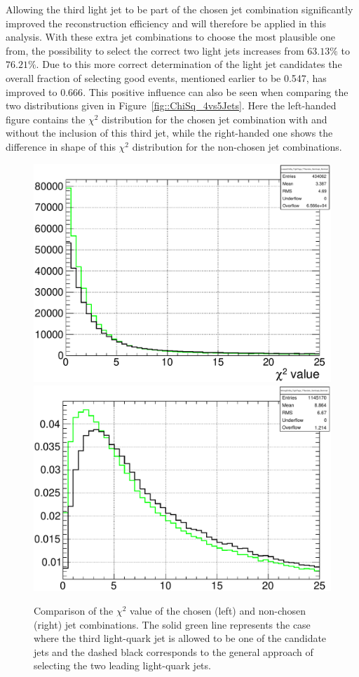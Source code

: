 Allowing the third light jet to be part of the chosen jet combination significantly improved the reconstruction efficiency and will therefore be applied in this analysis.
With these extra jet combinations to choose the most plausible one from, the possibility to select the correct two light jets increases from $63.13 \%$ to $76.21 \%$.
Due to this more correct determination of the light jet candidates the overall fraction of selecting good events, mentioned earlier to be 0.547, has improved to $0.666$.
This positive influence can also be seen when comparing the two distributions given in Figure~\ref{fig::ChiSq_4vs5Jets}. 
Here the left-handed figure contains the $\chi^{2}$ distribution for the chosen jet combination with and without the inclusion of this third jet, while the right-handed one shows the difference in shape of this $\chi^{2}$ distribution for the non-chosen jet combinations.
\begin{figure}[h!t]
 \centering
 \includegraphics[width = 0.45 \textwidth]{Chapters/Chapter4_EvtSel/Figures/LowestChiSqComparison.pdf}
 \includegraphics[width = 0.45 \textwidth]{Chapters/Chapter4_EvtSel/Figures/WrongChiSqComparison.pdf}    %
 \caption{Comparison of the $\chi^{2}$ value of the chosen (left) and non-chosen (right) jet combinations. The solid green line represents the case where the third light-quark jet is allowed to be one of the candidate jets and the dashed black corresponds to the general approach of selecting the two leading light-quark jets.}
\end{figure}

